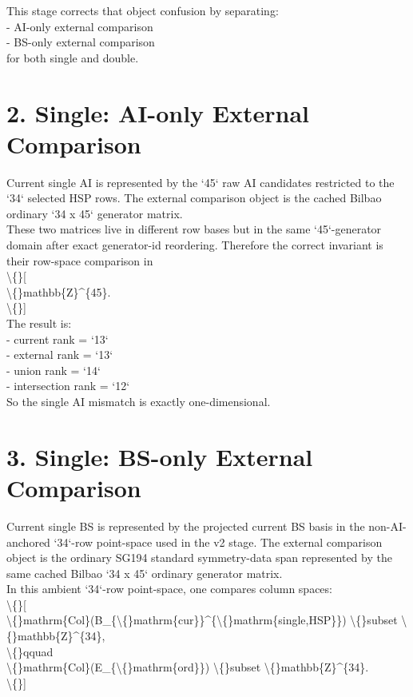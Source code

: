 \documentclass[11pt]{article}
\begin{document}
This stage corrects that object confusion by separating:\\

- AI-only external comparison\\
- BS-only external comparison\\

for both single and double.\\

\section*{2. Single: AI-only External Comparison}

Current single AI is represented by the `45` raw AI candidates restricted to the `34` selected HSP rows. The external comparison object is the cached Bilbao ordinary `34 x 45` generator matrix.\\

These two matrices live in different row bases but in the same `45`-generator domain after exact generator-id reordering. Therefore the correct invariant is their row-space comparison in\\
\textbackslash\{\}[\\
\textbackslash\{\}mathbb\{Z\}\textasciicircum{}\{45\}.\\
\textbackslash\{\}]\\

The result is:\\
- current rank = `13`\\
- external rank = `13`\\
- union rank = `14`\\
- intersection rank = `12`\\

So the single AI mismatch is exactly one-dimensional.\\

\section*{3. Single: BS-only External Comparison}

Current single BS is represented by the projected current BS basis in the non-AI-anchored `34`-row point-space used in the v2 stage. The external comparison object is the ordinary SG194 standard symmetry-data span represented by the same cached Bilbao `34 x 45` ordinary generator matrix.\\

In this ambient `34`-row point-space, one compares column spaces:\\
\textbackslash\{\}[\\
\textbackslash\{\}mathrm\{Col\}(B\_\{\textbackslash\{\}mathrm\{cur\}\}\textasciicircum{}\{\textbackslash\{\}mathrm\{single,HSP\}\}) \textbackslash\{\}subset \textbackslash\{\}mathbb\{Z\}\textasciicircum{}\{34\},\\
\textbackslash\{\}qquad\\
\textbackslash\{\}mathrm\{Col\}(E\_\{\textbackslash\{\}mathrm\{ord\}\}) \textbackslash\{\}subset \textbackslash\{\}mathbb\{Z\}\textasciicircum{}\{34\}.\\
\textbackslash\{\}]\\
\end{document}

